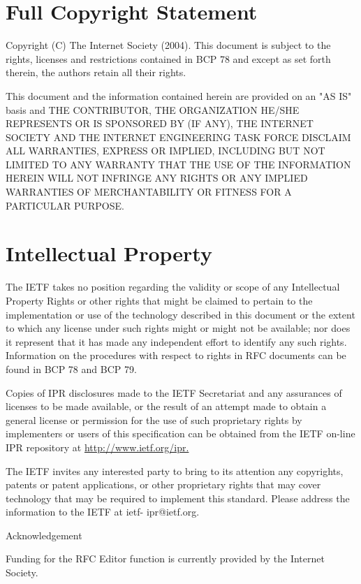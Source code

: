 \documentclass{article}
\begin{document}
\section*{Full Copyright Statement}

Copyright (C) The Internet Society (2004).  This document is subject to the rights, licenses and restrictions contained in BCP 78 and except as set forth therein, the authors retain all their rights.

This document and the information contained herein are provided on an "AS IS" basis and THE CONTRIBUTOR, THE ORGANIZATION HE/SHE REPRESENTS OR IS SPONSORED BY (IF ANY), THE INTERNET SOCIETY AND THE INTERNET ENGINEERING TASK FORCE DISCLAIM ALL WARRANTIES, EXPRESS OR IMPLIED, INCLUDING BUT NOT LIMITED TO ANY WARRANTY THAT THE USE OF THE INFORMATION HEREIN WILL NOT INFRINGE ANY RIGHTS OR ANY IMPLIED WARRANTIES OF MERCHANTABILITY OR FITNESS FOR A PARTICULAR PURPOSE.

\section*{Intellectual Property}

The IETF takes no position regarding the validity or scope of any Intellectual Property Rights or other rights that might be claimed to pertain to the implementation or use of the technology described in this document or the extent to which any license under such rights might or might not be available; nor does it represent that it has made any independent effort to identify any such rights.  Information on the procedures with respect to rights in RFC documents can be found in BCP 78 and BCP 79.

Copies of IPR disclosures made to the IETF Secretariat and any assurances of licenses to be made available, or the result of an attempt made to obtain a general license or permission for the use of such proprietary rights by implementers or users of this specification can be obtained from the IETF on-line IPR repository at \url{http://www.ietf.org/ipr.}

The IETF invites any interested party to bring to its attention any copyrights, patents or patent applications, or other proprietary rights that may cover technology that may be required to implement this standard.  Please address the information to the IETF at ietf- ipr@ietf.org.

Acknowledgement

Funding for the RFC Editor function is currently provided by the Internet Society.
\end{document}
